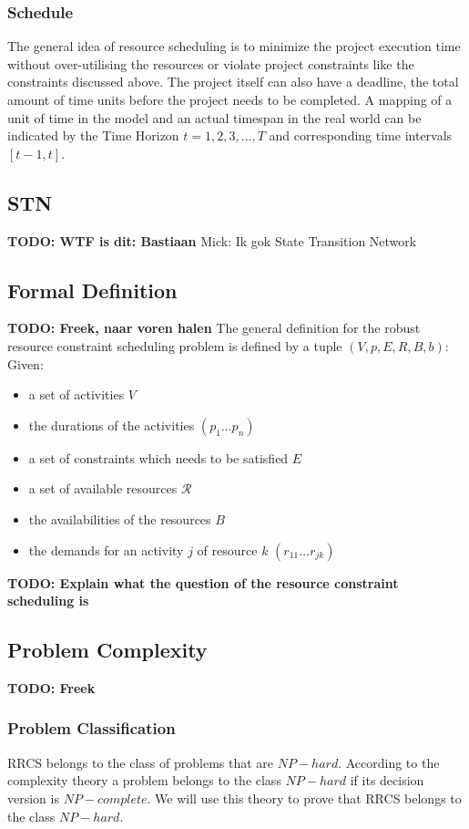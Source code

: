 \documentclass{article}
\newcommand{\TODO}[1]{{\color{red}\textbf{TODO: #1}}}
\begin{document}
\subsubsection{Schedule}
The general idea of resource scheduling is to minimize the project execution time without over-utilising the resources or violate project constraints like the constraints discussed above. The project itself can also have a deadline, the total amount of time units before the project needs to be completed. A mapping of a unit of time in the model and an actual timespan in the real world can be indicated by the Time Horizon $t=1,2,3,. . .,T$ and corresponding time intervals $[t-1,t]$. 

\subsection{STN}
\TODO{WTF is dit: Bastiaan}
Mick: Ik gok State Transition Network

\subsection{Formal Definition}
\TODO{Freek, naar voren halen}
The general definition for the robust resource constraint scheduling problem is defined by a tuple $(V, p, E,R,B, b)$:\\

Given:
\begin{itemize}
\item a set of activities $V$
\item the durations of the activities $(p_1\ldots p_n)$
\item a set of constraints which needs to be satisfied $E$
\item a set of available resources $\mathcal{R}$
\item the availabilities of the resources $B$
\item the demands for an activity $j$ of resource $k$ $(r_{11}\ldots r_{jk})$
\end{itemize}

\TODO{Explain what the question of the resource constraint scheduling is}

\subsection{Problem Complexity}
\TODO{Freek}
\subsubsection{Problem Classification}
RRCS belongs to the class of problems that are $NP-hard$. According to the complexity theory a problem belongs to the class $NP-hard$ if its decision version is $NP-complete$. We will use this theory to prove that RRCS belongs to the class $NP-hard$.
\end{document}
